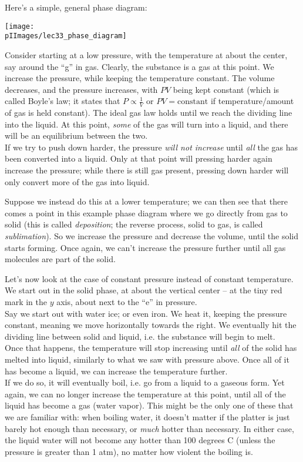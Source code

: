 Here's a simple, general phase diagram:

\begin{center}
\texttt{[image: \\pIImages/lec33\_phase\_diagram]}
\end{center}

Consider starting at a low pressure, with the temperature at about the center, say around the ``g'' in gas. Clearly, the substance is a gas at this point. We increase the pressure,  while keeping the temperature constant. The volume decreases, and the pressure increases, with $P V$ being kept constant (which is called Boyle's law; it states that $P \propto \frac{1}{V}$ or $PV = \text{constant}$ if temperature/amount of gas is held constant). The ideal gas law holds until we reach the dividing line into the liquid. At this point, \emph{some} of the gas will turn into a liquid, and there will be an equilibrium between the two.\\
If we try to push down harder, the pressure \emph{will not increase} until \emph{all} the gas has been converted into a liquid. Only at that point will pressing harder again increase the pressure; while there is still gas present, pressing down harder will only convert more of the gas into liquid.

Suppose we instead do this at a lower temperature; we can then see that there comes a point in this example phase diagram where we go directly from gas to solid (this is called \emph{deposition}; the reverse process, solid to gas, is called \emph{sublimation}). So we increase the pressure and decrease the volume, until the solid starts forming. Once again, we can't increase the pressure further until all gas molecules are part of the solid.

Let's now look at the case of constant pressure instead of constant temperature.\\
We start out in the solid phase, at about the vertical center -- at the tiny red mark in the $y$ axis, about next to the ``e'' in pressure.\\
Say we start out with water ice; or even iron. We heat it, keeping the pressure constant, meaning we move horizontally towards the right. We eventually hit the dividing line between solid and liquid, i.e. the substance will begin to melt.\\
Once that happens, the temperature will stop increasing until \emph{all} of the solid has melted into liquid, similarly to what we saw with pressure above. Once all of it has become a liquid, we can increase the temperature further.\\
If we do so, it will eventually boil, i.e. go from a liquid to a gaseous form. Yet again, we can no longer increase the temperature at this point, until all of the liquid has become a gas (water vapor). This might be the only one of these that we are familiar with: when boiling water, it doesn't matter if the platter is just barely hot enough than necessary, or \emph{much} hotter than necessary. In either case, the liquid water will not become any hotter than 100 degrees C (unless the pressure is greater than 1 atm), no matter how violent the boiling is.

